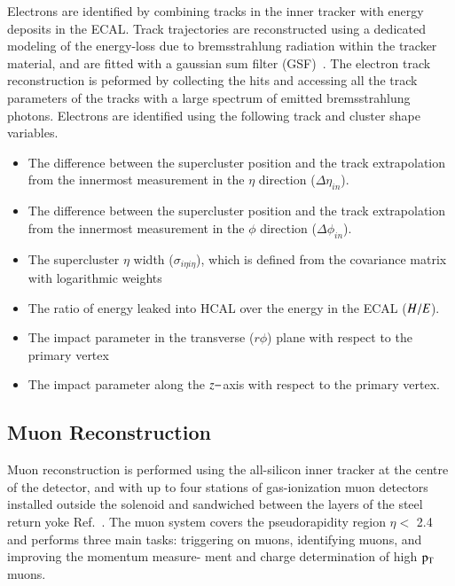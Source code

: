 Electrons are identified by combining tracks in the inner tracker with energy deposits in the ECAL. Track trajectories are reconstructed using a dedicated modeling of the energy-loss due to bremsstrahlung radiation within the tracker material, and are fitted with a gaussian sum filter (GSF)~\cite{GSF}. The electron track reconstruction is peformed by collecting the hits and accessing all the track parameters of the tracks with a large spectrum of emitted bremsstrahlung photons. Electrons are identified using  the following track and cluster shape variables.
\begin{itemize}

\item The difference between the supercluster position and the track extrapolation from the innermost measurement in the $\eta$ direction ($\Delta \eta_{in}$). \vspace{-0.2in}

\item The difference between the supercluster position and the track extrapolation from the innermost measurement in the  $\phi$ direction ($\Delta \phi_{in}$). \vspace{-0.2in}

\item The supercluster $\eta$ width ($\sigma_{i\eta i\eta}$), which is defined from the covariance matrix with logarithmic weights \vspace{-0.2in}

\item  The ratio of energy leaked into HCAL over the energy in the ECAL ($\it H/E$).\vspace{-0.2in}

\item The impact parameter in the transverse ($r\phi$) plane with respect to the primary vertex \vspace{-0.2in}

\item The impact parameter along the $\it z-$axis with respect to the primary vertex. 

\end{itemize}




\subsection{Muon Reconstruction}
Muon reconstruction is performed using the all-silicon inner tracker at the centre of the detector, and with up to four stations of gas-ionization muon detectors installed outside the solenoid and sandwiched between the layers of the steel return yoke Ref.~\cite{MuonReco}. The muon system covers the pseudorapidity region $\eta < $ 2.4 and performs three main tasks: triggering on muons, identifying muons, and improving the momentum measure-
ment and charge determination of high $\rm p_{T}$ muons.


